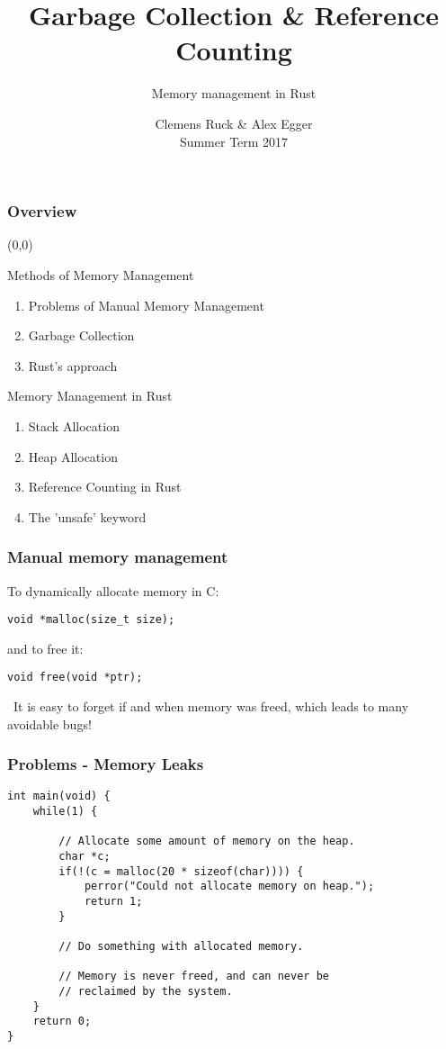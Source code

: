 \documentclass{beamer}
\title{Garbage Collection \& Reference Counting}
\author{Memory management in Rust}
\institute[TUM]{
	\vspace{-15em}\tumheader\vspace{18em}}
\date{Clemens Ruck \& Alex Egger \\ Summer Term 2017}
\newcommand{\attention}{{\scalebox{.75}{\bf}}\ }
\begin{document}
\maketitle
\begin{frame}
	\frametitle{Overview}
	\begin{textblock}{6}(0,0)
		\begin{alertblock}{Methods of Memory Management}
			\begin{enumerate}
				\item Problems of Manual Memory Management
				\item Garbage Collection
				\item Rust's approach
			\end{enumerate}
		\end{alertblock}
		\begin{alertblock}{Memory Management in Rust}
			\begin{enumerate}
				\item Stack Allocation
				\item Heap Allocation
				\item Reference Counting in Rust
				\item The 'unsafe' keyword
			\end{enumerate}
		\end{alertblock}
	\end{textblock}
\end{frame}
\begin{frame}[fragile]
	\frametitle{Manual memory management}
	To dynamically allocate memory in C:
	\begin{verbatim}
void *malloc(size_t size);
	\end{verbatim}
	and to free it:
	\begin{verbatim}
void free(void *ptr);
	\end{verbatim}
	\vspace{1cm}
	\attention It is easy to forget if and when memory was freed, which leads to many avoidable bugs!
\end{frame}
\begin{frame}[fragile]
	\frametitle{Problems - Memory Leaks}
	\begin{verbatim}
int main(void) {
	while(1) {

		// Allocate some amount of memory on the heap.
		char *c;
		if(!(c = malloc(20 * sizeof(char)))) {
			perror("Could not allocate memory on heap.");
			return 1;
		}

		// Do something with allocated memory.

		// Memory is never freed, and can never be 
		// reclaimed by the system.
	}
	return 0;
}
	\end{verbatim}
\end{frame}
\end{document}
